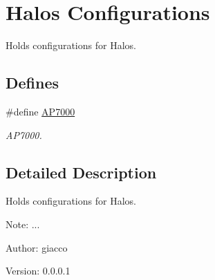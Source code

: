 \hypertarget{group___c_o_n_f_i_g}{
\section{Halos Configurations}
\label{group___c_o_n_f_i_g}
}
Holds configurations for Halos.  


\subsection*{Defines}
\begin{CompactItemize}
\item 
\hypertarget{group___c_o_n_f_i_g_g84b308e75c0d0ed50188f45a73af322e}{
\#define \hyperlink{group___c_o_n_f_i_g_g84b308e75c0d0ed50188f45a73af322e}{AP7000}}
\label{group___c_o_n_f_i_g_g84b308e75c0d0ed50188f45a73af322e}

\begin{CompactList}\small\item\em AP7000. \item\end{CompactList}\end{CompactItemize}


\subsection{Detailed Description}
Holds configurations for Halos. 

\begin{Desc}
\item[Note:]... \end{Desc}
\begin{Desc}
\item[Author:]giacco \end{Desc}
\begin{Desc}
\item[Version:]0.0.0.1 \end{Desc}
